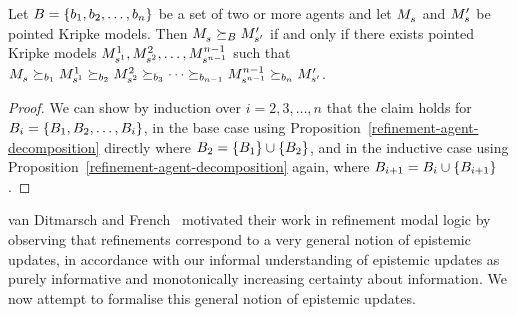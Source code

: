 \begin{corollary}
Let $\agentsB = \{\agentB_1, \agentB_2, \dots, \agentB_n\}$ be a set of two or more agents and let $\kPModel{\kStateS}$ and $\kPModelP{\kStateS}$ be pointed Kripke models.
Then $\kPModel{\kStateS} \simulatesBs \kPModelP{\kStateSP}$ if and only if there exists pointed Kripke models $\kPModel[1]{\kStateS[1]}, \kPModel[2]{\kStateS[2]}, \dots, \kPModel[n - 1]{\kStateS[n - 1]}$ such that $\kPModel{\kStateS} \simulates[\agentB_1] \kPModel[1]{\kStateS[1]} \simulates[\agentB_2] \kPModel[2]{\kStateS[2]} \simulates[\agentB_3] \cdots \simulates[\agentB_{n - 1}] \kPModel[n - 1]{\kStateS[n - 1]} \simulates[\agentB_n] \kPModelP{\kStateSP}$.
\end{corollary}

\begin{proof}
We can show by induction over $i = 2, 3, \dots, n$ that the claim holds for $\agentsB_i = \{\agentsB_1, \agentsB_2, \dots, \agentsB_i\}$, 
in the base case using Proposition~\ref{refinement-agent-decomposition} directly where $\agentsB_2 = \{\agentsB_1\} \cup \{\agentsB_2\}$, and
in the inductive case using Proposition~\ref{refinement-agent-decomposition} again, where $\agentsB_{i + 1} = \agentsB_i \cup \{\agentsB_{i + 1}\}$.
\end{proof}

van Ditmarsch and French~\cite{vanditmarsch:2009} motivated their work in refinement modal logic by observing that refinements correspond to a very general notion of epistemic updates, in accordance with our informal understanding of epistemic updates as purely informative and monotonically increasing certainty about information.
We now attempt to formalise this general notion of epistemic updates.

